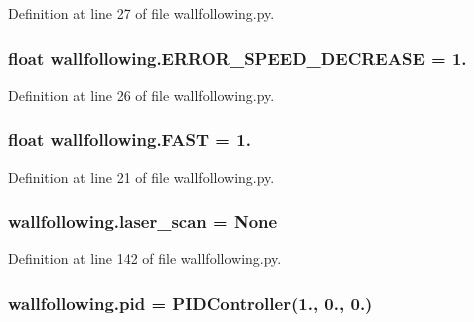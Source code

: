 Definition at line 27 of file wallfollowing.\+py.

\subsubsection[{\texorpdfstring{E\+R\+R\+O\+R\+\_\+\+S\+P\+E\+E\+D\+\_\+\+D\+E\+C\+R\+E\+A\+SE}{ERROR_SPEED_DECREASE}}]{\setlength{\rightskip}{0pt plus 5cm}float wallfollowing.\+E\+R\+R\+O\+R\+\_\+\+S\+P\+E\+E\+D\+\_\+\+D\+E\+C\+R\+E\+A\+SE = 1.}\hypertarget{namespacewallfollowing_a6e8aff0586478dde973909ebe62f58a5}{}\label{namespacewallfollowing_a6e8aff0586478dde973909ebe62f58a5}


Definition at line 26 of file wallfollowing.\+py.

\subsubsection[{\texorpdfstring{F\+A\+ST}{FAST}}]{\setlength{\rightskip}{0pt plus 5cm}float wallfollowing.\+F\+A\+ST = 1.}\hypertarget{namespacewallfollowing_ab1e7c06b4efb8e38a97ac8ec783a6beb}{}\label{namespacewallfollowing_ab1e7c06b4efb8e38a97ac8ec783a6beb}


Definition at line 21 of file wallfollowing.\+py.

\subsubsection[{\texorpdfstring{laser\+\_\+scan}{laser_scan}}]{\setlength{\rightskip}{0pt plus 5cm}wallfollowing.\+laser\+\_\+scan = None}\hypertarget{namespacewallfollowing_a35ff373c811db70d98205347a736c606}{}\label{namespacewallfollowing_a35ff373c811db70d98205347a736c606}


Definition at line 142 of file wallfollowing.\+py.

\subsubsection[{\texorpdfstring{pid}{pid}}]{\setlength{\rightskip}{0pt plus 5cm}wallfollowing.\+pid = {\bf P\+I\+D\+Controller}(1., 0., 0.)}\hypertarget{namespacewallfollowing_adc9f95e0b626be8ddae98a596a38e7e8}{}\label{namespacewallfollowing_adc9f95e0b626be8ddae98a596a38e7e8}


